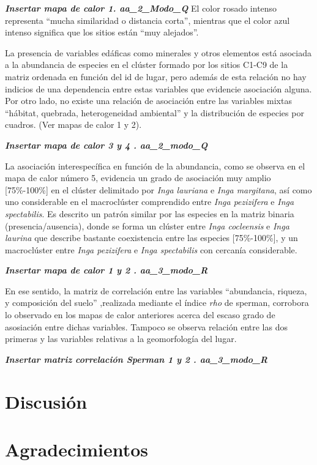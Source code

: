 \documentclass[11pt,]{article}
\begin{document}
\textbf{\emph{Insertar mapa de calor 1. aa\_2\_Modo\_Q}} El color rosado
intenso representa ``mucha similaridad o distancia corta'', mientras que
el color azul intenso significa que los sitios están ``muy alejados''.

La presencia de variables edáficas como minerales y otros elementos está
asociada a la abundancia de especies en el clúster formado por los
sitios C1-C9 de la matriz ordenada en función del id de lugar, pero
además de esta relación no hay indicios de una dependencia entre estas
variables que evidencie asociación alguna. Por otro lado, no existe una
relación de asociación entre las variables mixtas ``hábitat, quebrada,
heterogeneidad ambiental'' y la distribución de especies por cuadros.
(Ver mapas de calor 1 y 2).

\textbf{\emph{Insertar mapa de calor 3 y 4 . aa\_2\_modo\_Q}}

La asociación interespecífica en función de la abundancia, como se
observa en el mapa de calor número 5, evidencia un grado de asociación
muy amplio {[}75\%-100\%{]} en el clúster delimitado por \emph{Inga
lauriana} e \emph{Inga margitana}, así como uno considerable en el
macroclúster comprendido entre \emph{Inga pezizifera} e \emph{Inga
spectabilis}. Es descrito un patrón similar por las especies en la
matriz binaria (presencia/ausencia), donde se forma un clúster entre
\emph{Inga cocleensis} e \emph{Inga laurina} que describe bastante
coexistencia entre las especies {[}75\%-100\%{]}, y un macroclúster
entre \emph{Inga pezizifera} e \emph{Inga spectabilis} con cercanía
considerable.

\textbf{\emph{Insertar mapa de calor 1 y 2 . aa\_3\_modo\_R}}

En ese sentido, la matriz de correlación entre las variables
``abundancia, riqueza, y composición del suelo'' ,realizada mediante el
índice \emph{rho} de sperman, corrobora lo observado en los mapas de
calor anteriores acerca del escaso grado de asosiación entre dichas
variables. Tampoco se observa relación entre las dos primeras y las
variables relativas a la geomorfología del lugar.

\textbf{\emph{Insertar matriz correlación Sperman 1 y 2 .
aa\_3\_modo\_R}}

\section{Discusión}\label{discusiuxf3n}

\section{Agradecimientos}\label{agradecimientos}
\end{document}
